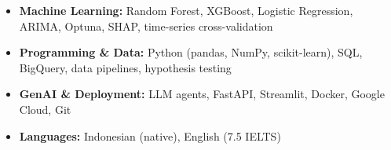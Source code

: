 \begin{itemize}[left=0pt]
    \item \small{\textbf{Machine Learning:} Random Forest, XGBoost, Logistic Regression, ARIMA, Optuna, SHAP, time-series cross-validation}
    \item \small{\textbf{Programming \& Data:} Python (pandas, NumPy, scikit-learn), SQL, BigQuery, data pipelines, hypothesis testing}
    \item \small{\textbf{GenAI \& Deployment:} LLM agents, FastAPI, Streamlit, Docker, Google Cloud, Git}
    \item \small{\textbf{Languages:} Indonesian (native), English (7.5 IELTS)}
\end{itemize}
\vspace{2pt}
